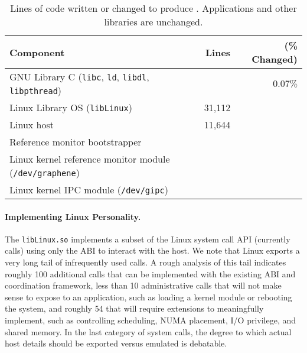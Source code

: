 \begin{table}[t!b!]
\footnotesize
\centering
\begin{tabular}{|l|rr|}
\hline
{\bf Component} & {\bf Lines} & ({\bf \% Changed})\\
\hline
GNU Library C ({\tt libc}, {\tt ld}, {\tt libdl}, {\tt libpthread}) & \libclines{} & $0.07\%$ \\
\hline
Linux Library OS ({\tt libLinux}) & 31,112 & \\
Linux host \pal{} & 11,644 & \\
\hline
Reference monitor bootstrapper & {} & \\
Linux kernel reference monitor module ({\tt /dev/graphene}) & \sandboxmodlines{} & \\
Linux kernel IPC module ({\tt /dev/gipc}) & \gipclines{} & \\
\hline
\end{tabular}
\caption[\sysname{}: lines of code written or changed]
{Lines of code written or changed to produce \sysname{}.  Applications and other libraries are unchanged.}
\label{tab:graphene:loc}
\end{table}





\paragraph{Implementing Linux Personality.} 
The \sysname{} {\tt libLinux.so} implements a subset 
of the Linux system call API (currently \syscalls{} calls)
using only the \pal{} ABI to interact with the host.
We note that Linux exports a very long tail of infrequently used calls.
A rough analysis of this tail indicates roughly 100 additional calls that can be implemented
with the existing \pal{} ABI and coordination framework, less than 10 administrative calls that will not make sense to expose to 
an application, such as loading a kernel module or rebooting the system, and roughly 54 that will require 
\pal{} extensions to meaningfully implement, such as controlling scheduling,
NUMA placement, I/O privilege, and shared memory.
In the last category of system calls, the degree to which actual host details should be exported versus emulated is debatable.

